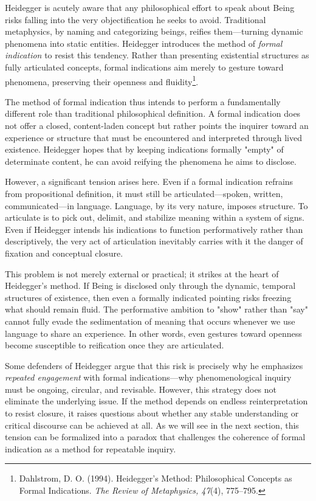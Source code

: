 \documentclass{article}
\begin{document}
Heidegger is acutely aware that any philosophical effort to speak about Being risks falling into the very objectification he seeks to avoid. Traditional metaphysics, by naming and categorizing beings, reifies them---turning dynamic phenomena into static entities. Heidegger introduces the method of \textit{formal indication} to resist this tendency. Rather than presenting existential structures as fully articulated concepts, formal indications aim merely to gesture toward phenomena, preserving their openness and fluidity\footnote{Dahlstrom, D. O. (1994). Heidegger's Method: Philosophical Concepts as Formal Indications. \textit{The Review of Metaphysics, 47}(4), 775--795.}.

The method of formal indication thus intends to perform a fundamentally different role than traditional philosophical definition. A formal indication does not offer a closed, content-laden concept but rather points the inquirer toward an experience or structure that must be encountered and interpreted through lived existence. Heidegger hopes that by keeping indications formally "empty" of determinate content, he can avoid reifying the phenomena he aims to disclose.

However, a significant tension arises here. Even if a formal indication refrains from propositional definition, it must still be articulated---spoken, written, communicated---in language. Language, by its very nature, imposes structure. To articulate is to pick out, delimit, and stabilize meaning within a system of signs. Even if Heidegger intends his indications to function performatively rather than descriptively, the very act of articulation inevitably carries with it the danger of fixation and conceptual closure.

This problem is not merely external or practical; it strikes at the heart of Heidegger's method. If Being is disclosed only through the dynamic, temporal structures of existence, then even a formally indicated pointing risks freezing what should remain fluid. The performative ambition to "show" rather than "say" cannot fully evade the sedimentation of meaning that occurs whenever we use language to share an experience. In other words, even gestures toward openness become susceptible to reification once they are articulated.

Some defenders of Heidegger argue that this risk is precisely why he emphasizes \textit{repeated engagement} with formal indications---why phenomenological inquiry must be ongoing, circular, and revisable. However, this strategy does not eliminate the underlying issue. If the method depends on endless reinterpretation to resist closure, it raises questions about whether any stable understanding or critical discourse can be achieved at all. As we will see in the next section, this tension can be formalized into a paradox that challenges the coherence of formal indication as a method for repeatable inquiry.
\end{document}
